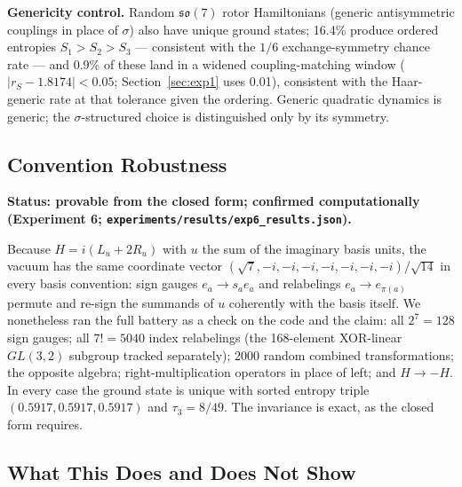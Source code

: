 \documentclass[11pt]{article}
\begin{document}
\textbf{Genericity control.} Random $\mathfrak{so}(7)$ rotor Hamiltonians (generic antisymmetric couplings in place of $\sigma$) also have unique ground states; 16.4\% produce ordered entropies $S_1 > S_2 > S_3$ --- consistent with the $1/6$ exchange-symmetry chance rate --- and 0.9\% of these land in a widened coupling-matching window ($|r_S - 1.8174| < 0.05$; Section~\ref{sec:exp1} uses 0.01), consistent with the Haar-generic rate at that tolerance given the ordering. Generic quadratic dynamics is generic; the $\sigma$-structured choice is distinguished only by its symmetry.

\subsection{Convention Robustness}
\label{sec:robustness}

\textbf{Status: provable from the closed form; confirmed computationally (Experiment 6; \texttt{experiments/results/exp6\_results.json}).}

Because $H = i(L_u + 2R_u)$ with $u$ the sum of the imaginary basis units, the vacuum has the same coordinate vector $(\sqrt{7}, -i, -i, -i, -i, -i, -i, -i)/\sqrt{14}$ in every basis convention: sign gauges $e_a \to s_a e_a$ and relabelings $e_a \to e_{\pi(a)}$ permute and re-sign the summands of $u$ coherently with the basis itself. We nonetheless ran the full battery as a check on the code and the claim: all $2^7 = 128$ sign gauges; all $7! = 5040$ index relabelings (the 168-element XOR-linear $GL(3,2)$ subgroup tracked separately); 2000 random combined transformations; the opposite algebra; right-multiplication operators in place of left; and $H \to -H$. In every case the ground state is unique with sorted entropy triple $(0.5917, 0.5917, 0.5917)$ and $\tau_3 = 8/49$. The invariance is exact, as the closed form requires.

\subsection{What This Does and Does Not Show}
\label{sec:rotorscope}
\end{document}
